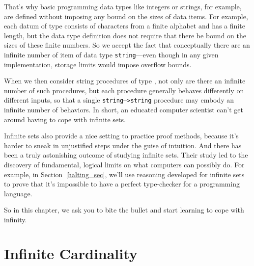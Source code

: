 \begin{editingnotes}
That's why basic programming data types like integers or
strings, for example, are defined without imposing any bound on the
sizes of data items.  For example, each datum of type
 consists of characters from a finite alphabet
and has a finite length, but the data type definition does not require
that there be bound on the sizes of these finite numbers.  So we
accept the fact that conceptually there are an infinite number of item
of data type \texttt{string}---even though in any given
implementation, storage limits would impose overflow bounds.

When we then consider string procedures of type
, not only are there an infinite number
of such procedures, but each procedure generally behaves differently
on different inputs, so that a single \texttt{string-->string}
procedure may embody an infinite number of behaviors.  In short, an
educated computer scientist can't get around having to cope with
infinite sets.
\end{editingnotes}

Infinite sets also provide a nice setting to practice proof methods,
because it's harder to sneak in unjustified steps under the guise of
intuition.  And there has been a truly astonishing outcome of studying
infinite sets.  Their study led to the discovery of fundamental, logical
limits on what computers can possibly do.  For example, in
Section~\ref{halting_sec}, we'll use reasoning developed for infinite
sets to prove that it's impossible to have a perfect type-checker for
a programming language.

So in this chapter, we ask you to bite the bullet and start learning to
cope with infinity.

\iffalse 
But as a warmup, we'll first examine some basic properties of
\emph{finite} sets.
\fi

\section{Infinite Cardinality}\label{infinite_sec}

